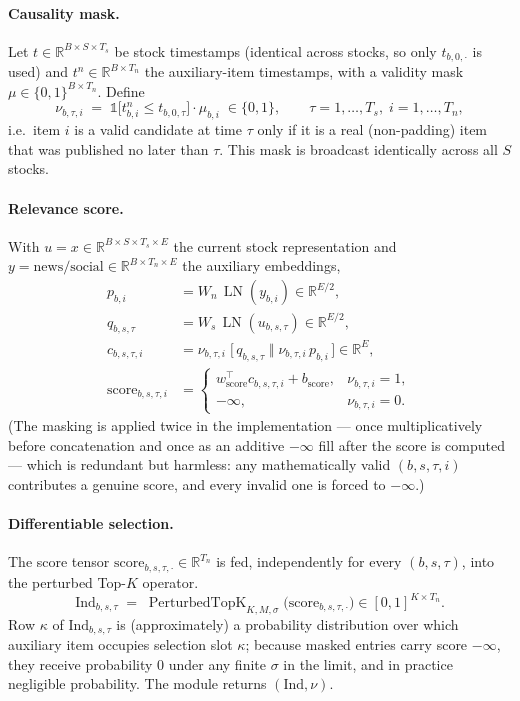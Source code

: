 \documentclass[stu,floatsintext]{apa7}
\newcommand{\R}{\mathbb{R}}
\newcommand{\LN}{\operatorname{LN}}
\begin{document}
\paragraph{Causality mask.} Let $t\in\R^{B\times S\times T_s}$ be stock timestamps (identical across
stocks, so only $t_{b,0,\cdot}$ is used) and $t^{n}\in\R^{B\times T_n}$ the auxiliary-item timestamps, with
a validity mask $\mu\in\{0,1\}^{B\times T_n}$. Define
\begin{equation}
  \nu_{b,\tau,i} \;=\; \mathbb 1\bigl[t^{n}_{b,i} \le t_{b,0,\tau}\bigr]\cdot \mu_{b,i}
  \;\in\{0,1\}, \qquad \tau=1,\dots,T_s,\; i=1,\dots,T_n,
\end{equation}
i.e.\ item $i$ is a valid candidate at time $\tau$ only if it is a real (non-padding) item that was
published no later than $\tau$. This mask is broadcast identically across all $S$ stocks.

\paragraph{Relevance score.} With $u = x\in\R^{B\times S\times T_s\times E}$ the current stock
representation and $y=\mathrm{news/social}\in\R^{B\times T_n\times E}$ the auxiliary embeddings,
\begin{align}
  p_{b,i} &= W_n\,\LN(y_{b,i}) \in\R^{E/2}, \\
  q_{b,s,\tau} &= W_s\,\LN(u_{b,s,\tau}) \in\R^{E/2}, \\
  c_{b,s,\tau,i} &= \nu_{b,\tau,i}\;\bigl[\,q_{b,s,\tau} \;\Vert\; \nu_{b,\tau,i}\, p_{b,i}\,\bigr]
  \in\R^{E},\\
  \mathrm{score}_{b,s,\tau,i} &=
  \begin{cases}
    w_{\mathrm{score}}^\top c_{b,s,\tau,i} + b_{\mathrm{score}}, & \nu_{b,\tau,i}=1,\\[2pt]
    -\infty, & \nu_{b,\tau,i}=0.
  \end{cases}
\end{align}
(The masking is applied twice in the implementation — once multiplicatively before concatenation and once
as an additive $-\infty$ fill after the score is computed — which is redundant but harmless: any
mathematically valid $(b,s,\tau,i)$ contributes a genuine score, and every invalid one is forced to
$-\infty$.)

\paragraph{Differentiable selection.} The score tensor $\mathrm{score}_{b,s,\tau,\cdot}\in\R^{T_n}$ is fed,
independently for every $(b,s,\tau)$, into the perturbed Top-$K$ operator.
\begin{equation}
  \mathrm{Ind}_{b,s,\tau} \;=\; \operatorname{PerturbedTopK}_{K,M,\sigma}\bigl(\mathrm{score}_{b,s,\tau,\cdot}\bigr)
  \in [0,1]^{K\times T_n}.
\end{equation}
Row $\kappa$ of $\mathrm{Ind}_{b,s,\tau}$ is (approximately) a probability distribution over which
auxiliary item occupies selection slot $\kappa$; because masked entries carry score $-\infty$, they receive
probability $0$ under any finite $\sigma$ in the limit, and in practice negligible probability. The module
returns $(\mathrm{Ind}, \nu)$.
\end{document}
